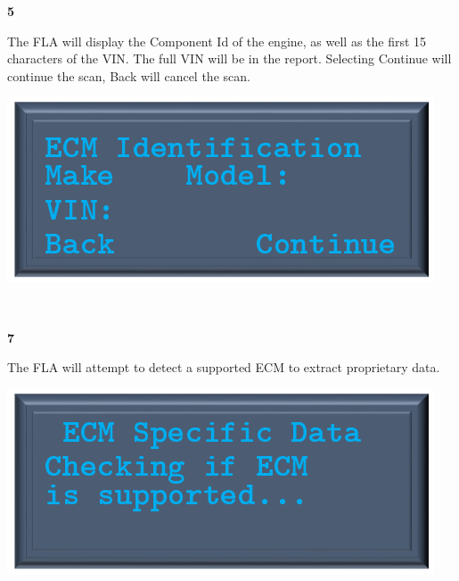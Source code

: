 \documentclass[11pt, oneside]{book}
\begin{document}
\noindent\begin{minipage}{0.45\textwidth}%
\begin{center}
\textbf{5}\\[\baselineskip]
\end{center}
The FLA will display the Component Id of the engine, as well as the first 15 characters of the VIN. The full VIN will be in the report. Selecting Continue will continue the scan, Back will cancel the scan.
\end{minipage}%
\hfill%
\begin{minipage}{0.45\textwidth}
\includegraphics[width=\linewidth]{../media/pstricks_files/15_ecm_identification}
\end{minipage}
\\[\baselineskip]
\noindent\begin{minipage}{0.45\textwidth}%
\begin{center}
\textbf{7}\\[\baselineskip]
\end{center}
The FLA will attempt to detect a supported ECM to extract proprietary data.
\end{minipage}%
\hfill%
\begin{minipage}{0.45\textwidth}
\includegraphics[width=\linewidth]{../media/pstricks_files/16_ecm_specific_checking}
\end{minipage}
\end{document}
